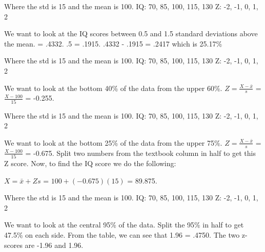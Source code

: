 \documentclass[11pt]{report}
\begin{document}
{
Where the std is 15 and the mean is 100. \newline
IQ: 70, 85, 100, 115, 130 \newline
Z: -2, -1, 0, 1, 2 \newline

We want to look at the IQ scores between 0.5 and 1.5 standard deviations above the mean.  = .4332. \newline
.5 = .1915. \newline
.4332 - .1915 = .2417 which is 25.17\% \newline 
}

{
Where the std is 15 and the mean is 100. \newline
IQ: 70, 85, 100, 115, 130 \newline
Z: -2, -1, 0, 1, 2 \newline

We want to look at the bottom 40\% of the data from the upper 60\%. \newline
$Z = \frac{X - \bar{x}}{s}$ = $\frac{X - 100}{15}$ = -0.255. \newline
}

{
Where the std is 15 and the mean is 100. \newline
IQ: 70, 85, 100, 115, 130 \newline
Z: -2, -1, 0, 1, 2 \newline

We want to look at the bottom 25\% of the data from the upper 75\%. \newline
$Z = \frac{X - \bar{x}}{s}$ = $\frac{X - 100}{15}$ = -0.675. \newline
Split two numbers from the textbook column in half to get this Z score. \newline
Now, to find the IQ score we do the following: \newline

$X = \bar{x} + Zs$ = $100 + (-0.675)(15)$ = 89.875. \newline
}

{
Where the std is 15 and the mean is 100. \newline
IQ: 70, 85, 100, 115, 130 \newline
Z: -2, -1, 0, 1, 2 \newline

We want to look at the central 95\% of the data. \newline
Split the 95\% in half to get 47.5\% on each side. \newline
From the table, we can see that 1.96 = .4750. \newline
The two z-scores are -1.96 and 1.96. \newline
}
\end{document}
